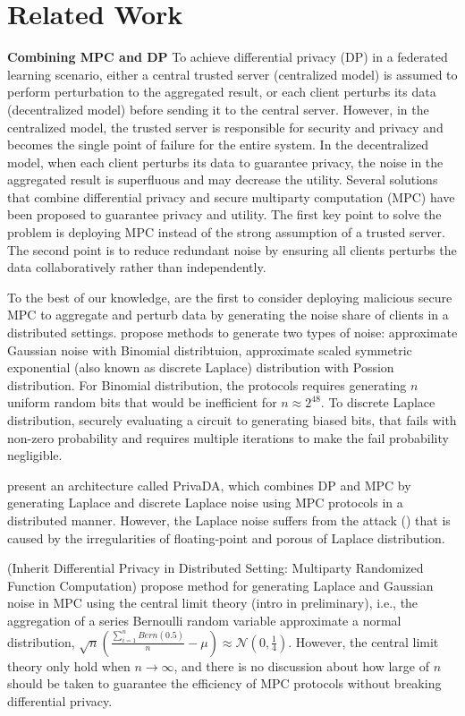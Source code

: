 \chapter{Related Work}
\label{cha:RelatedWork}

\textbf{Combining MPC and DP}
To achieve differential privacy (DP) in a federated learning scenario, either a central trusted server (centralized model) is assumed to perform perturbation to the aggregated result, or each client perturbs its data (decentralized model) before sending it to the central server. However, in the centralized model, the trusted server is responsible for security and privacy and becomes the single point of failure for the entire system. In the decentralized model, when each client perturbs its data to guarantee privacy, the noise in the aggregated result is superﬂuous and may decrease the utility. 
Several solutions that combine differential privacy and secure multiparty computation (MPC) have been proposed to guarantee privacy and utility. The first key point to solve the problem is deploying MPC instead of the strong assumption of a trusted server. The second point is to reduce redundant noise by ensuring all clients perturbs the data collaboratively rather than independently. 


To the best of our knowledge, \cite{dwork2006our} are the first to consider deploying malicious secure MPC to aggregate and perturb data by generating the noise share of clients in a distributed settings. \cite{dwork2006our} propose methods to generate two types of noise: approximate Gaussian noise with Binomial distribtuion, approximate scaled symmetric exponential (also known as discrete Laplace) distribution with Possion distribution. For Binomial distribution, the protocols requires generating $n$ uniform random bits that would be inefficient for $n\approx 2^{48}$. To discrete Laplace distribution, \cite{dwork2006our} securely evaluating a circuit to generating biased bits, that fails with non-zero probability and requires multiple iterations to make the fail probability negligible. 

\cite{eigner2014differentially} present an architecture called PrivaDA, which combines DP and MPC by generating Laplace and discrete Laplace noise using MPC protocols in a distributed manner. However, the Laplace noise suffers from the attack (\cite{mironov2012significance}) that is caused by the irregularities of floating-point and porous of Laplace distribution. 

(Inherit Differential Privacy in Distributed Setting: Multiparty Randomized Function Computation) propose method for generating Laplace and Gaussian noise in MPC using the central limit theory (intro in preliminary), i.e., the aggregation of a series Bernoulli random variable approximate a normal distribution, $\sqrt{n}\left(\frac{\sum_{i = 1}^{n}  Bern\left(0.5\right) }{n}-\mu\right) \approx \mathcal{N} \left(0,\frac{1}{4}\right)   $. However, the central limit theory only hold when $n \to \infty $, and there is no discussion about how large of $n$ should be taken to guarantee the efficiency of MPC protocols without breaking differential privacy. 

